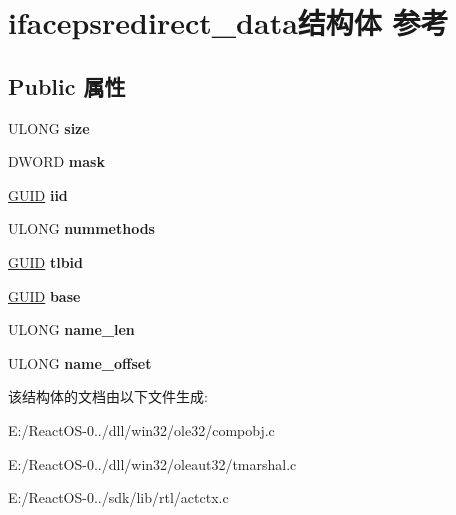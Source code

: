 \hypertarget{structifacepsredirect__data}{}\section{ifacepsredirect\+\_\+data结构体 参考}
\label{structifacepsredirect__data}
\subsection*{Public 属性}
\begin{DoxyCompactItemize}
\item 
\mbox{\label{structifacepsredirect__data_a404bed5694247935ed8facb7f2ba59b0}} 
U\+L\+O\+NG {\bfseries size}
\item 
\mbox{\label{structifacepsredirect__data_a527fdc27f0505dc25e9cf15b59171e57}} 
D\+W\+O\+RD {\bfseries mask}
\item 
\mbox{\label{structifacepsredirect__data_a485c135e3450e90f0cca7b43fbf7f641}} 
\hyperlink{interface_g_u_i_d}{G\+U\+ID} {\bfseries iid}
\item 
\mbox{\label{structifacepsredirect__data_a96b3c4454686f4cae19eb32f557fe121}} 
U\+L\+O\+NG {\bfseries nummethods}
\item 
\mbox{\label{structifacepsredirect__data_ac0018322d31370e8265837dcb0a59fdb}} 
\hyperlink{interface_g_u_i_d}{G\+U\+ID} {\bfseries tlbid}
\item 
\mbox{\label{structifacepsredirect__data_a789dc942df4f545b038b633efdf07f95}} 
\hyperlink{interface_g_u_i_d}{G\+U\+ID} {\bfseries base}
\item 
\mbox{\label{structifacepsredirect__data_aff6b8be3e133c1342813213750a3e2c9}} 
U\+L\+O\+NG {\bfseries name\+\_\+len}
\item 
\mbox{\label{structifacepsredirect__data_a50092e2b463c4c654523ce1b8b21e9e4}} 
U\+L\+O\+NG {\bfseries name\+\_\+offset}
\end{DoxyCompactItemize}


该结构体的文档由以下文件生成\+:\begin{DoxyCompactItemize}
\item 
E\+:/\+React\+O\+S-\/0../dll/win32/ole32/compobj.\+c\item 
E\+:/\+React\+O\+S-\/0../dll/win32/oleaut32/tmarshal.\+c\item 
E\+:/\+React\+O\+S-\/0../sdk/lib/rtl/actctx.\+c\end{DoxyCompactItemize}
